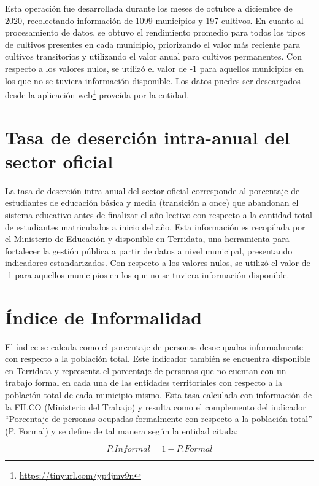 Esta operación fue desarrollada durante los meses de octubre a diciembre de 2020, recolectando información de 1099 municipios y 197 cultivos. En cuanto al 
procesamiento de datos, se obtuvo el rendimiento promedio para todos los tipos de cultivos presentes en cada municipio, priorizando el valor más reciente para 
cultivos transitorios y utilizando el valor anual para cultivos permanentes. Con respecto a los valores nulos, se utilizó el valor de -1 para aquellos 
municipios en los que no se tuviera información disponible.  Los datos puedes ser descargados desde la aplicación 
web\footnote{\url{https://tinyurl.com/yp4jmv9n}} proveída por la entidad.
 
\section{Tasa de deserción intra-anual del sector oficial}

La tasa de deserción intra-anual del sector oficial corresponde al porcentaje de estudiantes de educación básica y media (transición a once) que abandonan el 
sistema educativo antes de finalizar el año lectivo con respecto a la cantidad total de estudiantes matriculados a inicio del año. Esta información es 
recopilada por el Ministerio de Educación y disponible en Terridata, una herramienta para fortalecer la gestión pública a partir de datos a nivel municipal, 
presentando indicadores estandarizados. Con respecto a los valores nulos, se utilizó el valor de -1 para aquellos municipios en los que no se tuviera 
información disponible.

\section{Índice de Informalidad}

El índice se calcula como el porcentaje de personas desocupadas informalmente con respecto a la población total.  Este indicador también se encuentra 
disponible en Terridata y representa el porcentaje de personas que no cuentan con un trabajo formal en cada una de las entidades territoriales con respecto a 
la población total de cada municipio mismo. Esta tasa calculada con información de la FILCO (Ministerio del Trabajo) y resulta como el complemento del 
indicador ``Porcentaje de personas ocupadas formalmente con respecto a la población total'' (P. Formal) y se define de tal manera según la entidad citada: 

$$P. Informal = 1 - P. Formal$$

